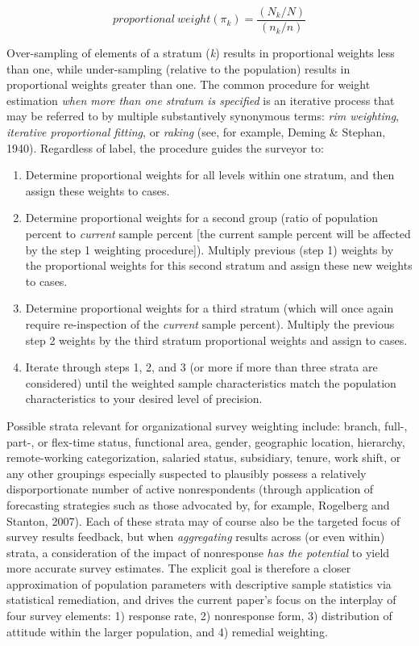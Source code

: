 \documentclass[
  man,mask]{apa7}
\begin{document}
\begin{equation}
proportional \: weight(\pi_k) = \frac{(N_k/N)}{(n_k/n)}
\end{equation}

Over-sampling of elements of a stratum (\emph{k}) results in proportional weights less than one, while under-sampling (relative to the population) results in proportional weights greater than one.
The common procedure for weight estimation \emph{when more than one stratum is specified} is an iterative process that may be referred to by multiple substantively synonymous terms: \emph{rim weighting}, \emph{iterative proportional fitting}, or \emph{raking} (see, for example, Deming \& Stephan, 1940). Regardless of label, the procedure guides the surveyor to:

\begin{enumerate}
\def\labelenumi{\arabic{enumi})}
\item
  Determine proportional weights for all levels within one stratum, and then assign these weights to cases.
\item
  Determine proportional weights for a second group (ratio of population percent to \emph{current} sample percent {[}the current sample percent will be affected by the step 1 weighting procedure{]}). Multiply previous (step 1) weights by the proportional weights for this second stratum and assign these new weights to cases.
\item
  Determine proportional weights for a third stratum (which will once again require re-inspection of the \emph{current} sample percent). Multiply the previous step 2 weights by the third stratum proportional weights and assign to cases.
\item
  Iterate through steps 1, 2, and 3 (or more if more than three strata are considered) until the weighted sample characteristics match the population characteristics to your desired level of precision.
\end{enumerate}

Possible strata relevant for organizational survey weighting include: branch, full-, part-, or flex-time status, functional area, gender, geographic location, hierarchy, remote-working categorization, salaried status, subsidiary, tenure, work shift, or any other groupings especially suspected to plausibly possess a relatively disporportionate number of active nonrespondents (through application of forecasting strategies such as those advocated by, for example, Rogelberg and Stanton, 2007). Each of these strata may of course also be the targeted focus of survey results feedback, but when \emph{aggregating} results across (or even within) strata, a consideration of the impact of nonresponse \emph{has the potential} to yield more accurate survey estimates. The explicit goal is therefore a closer approximation of population parameters with descriptive sample statistics via statistical remediation, and drives the current paper's focus on the interplay of four survey elements: 1) response rate, 2) nonresponse form, 3) distribution of attitude within the larger population, and 4) remedial weighting.
\end{document}
